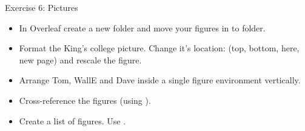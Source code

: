 \documentclass[10pt,times]{beamer}
\begin{document}
\begin{frame}[fragile]{Exercise 6: Pictures}

\begin{center}
\end{center}

\begin{itemize}
\item In Overleaf create a new folder  and move your figures in to  folder.
\item Format the King's college picture. Change it's location: (top, 
bottom, here, new page) and rescale the figure.
\item Arrange Tom, WallE and Dave inside a single figure environment 
vertically.
\item Cross-reference the figures (using ).
\item Create a list of figures. Use .
\end{itemize}

\begin{center}
%
\end{center}

\end{frame}


\end{document}
